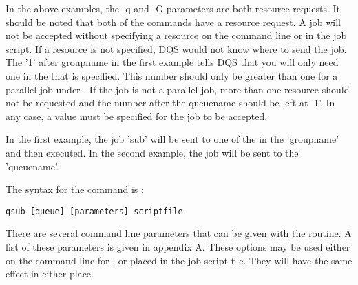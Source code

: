 In the above examples, the -q and -G parameters are both resource
requests.  It should be noted that both of the \qsub commands have a
resource request.  A job will not be accepted without specifying a resource
on the command line or in the job script.  If a resource is not specified,
DQS would not
know where to send the job.
The '1' after groupname in the first
example tells DQS that you will only need one \queue
in the \group that is specified.  This number should only be
greater than one for a parallel job under \pvm.  If the job is not a
parallel job, more than one resource should not be requested and the
number after the queuename should be left at '1'.  In any case, a value
must be specified for the job to be accepted.

In the first \qsub example, the job 'sub' will be sent to one of the
\queues in the \group 'groupname' and then executed.  In the second \qsub
example, the job will be sent to the \queue 'queuename'.

The syntax for the \qsub command is :
\begin{verbatim}
qsub [queue] [parameters] scriptfile
\end{verbatim}
There are several command line
parameters that can be given with the \qsub routine.  A list of these
parameters is given in appendix A.
These options may be used either on the command line for \qsub, or
placed in the job script file.  They will have the same effect in either
place.
